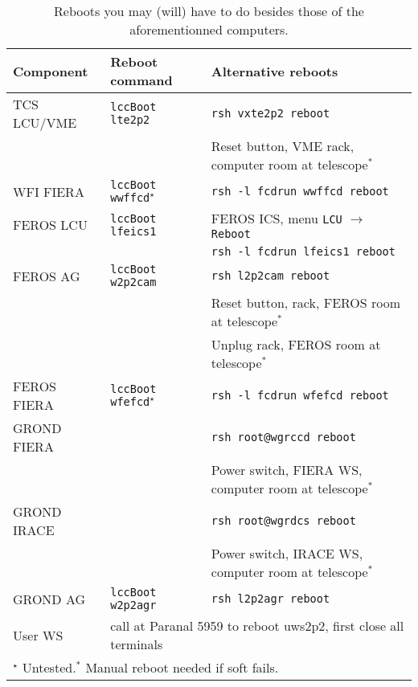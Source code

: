 \documentclass[11pt,fleqn]{book}
\begin{document}
\begin{table}
\caption[Some useful reboots]{Reboots you may (will) have to do besides those of the aforementionned computers.}
\label{tab:reboots}
\centering
\begin{tabular}{lll}
\hline
Component   & Reboot command                       & Alternative reboots\\
\hline\hline
TCS LCU/VME & \texttt{lccBoot \gls{lte2p2}}        & \texttt{rsh vxte2p2 reboot}\\ 
            &                                      & Reset button, VME rack, computer room at telescope$^\ast$\\
\hline
WFI FIERA   & \texttt{lccBoot \gls{wwffcd}}$^\star$& \texttt{rsh -l fcdrun wwffcd reboot}\\
\hline
FEROS LCU   & \texttt{lccBoot \gls{lfeics1}}       & FEROS ICS, menu \texttt{LCU} $\rightarrow$ \texttt{Reboot}\\
            &                                      & \texttt{rsh -l fcdrun lfeics1 reboot}\\
FEROS AG    & \texttt{lccBoot w2p2cam}             & \texttt{rsh \gls{l2p2cam} reboot}\\
            &                                      & Reset button, rack, FEROS room at telescope$^\ast$\\
            &                                      & Unplug rack, FEROS room at telescope$^\ast$\\
FEROS FIERA & \texttt{lccBoot \gls{wfefcd}}$^\star$& \texttt{rsh -l fcdrun wfefcd reboot}\\
\hline
GROND FIERA &                                      & \texttt{rsh root@\gls{wgrccd} reboot}\\
            &                                      & Power switch, FIERA WS, computer room at telescope$^\ast$\\
GROND IRACE &                                      & \texttt{rsh root@wgrdcs reboot}\\
            &                                      & Power switch, IRACE WS, computer room at telescope$^\ast$\\
GROND AG    & \texttt{lccBoot w2p2agr}             & \texttt{rsh \gls{l2p2agr} reboot}\\
\hline
User WS     & \multicolumn{2}{l}{call at Paranal 5959 to reboot \gls{uws2p2}, first close all terminals}\\
\hline
\multicolumn{3}{l}{$^\star$ Untested.\quad $^\ast$ Manual reboot needed if soft fails.}\\
\hline
\end{tabular}
\end{table}
\end{document}
